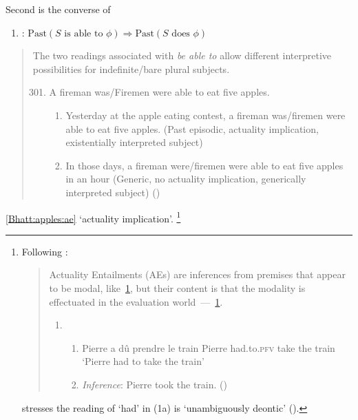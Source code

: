 \begin{note}
  Second is the converse of \BoyPS{}

  \begin{enumerate}[label=]
  \item
    \label{Boylan:Past-Success:C}
    \BoyPSC{}: \(\text{Past}(S\text{ is able to }\phi) \Rightarrow \text{Past}(S\text{ does }\phi)\)
  \end{enumerate}

  \citeauthor{Bhatt:2008aa}

  \begin{quote}
    The two readings associated with \emph{be able to} allow different interpretive possibilities for indefinite/bare plural subjects.
    \begin{enumerate}[label=(\arabic*), ref=(\arabic*)]
      \setcounter{enumi}{300}
    \item
      A fireman was/Firemen were able to eat five apples.
      \begin{enumerate}[label=\alph*., ref=(301\alph*)]
      \item
        \label{Bhatt:apples:ae}
        Yesterday at the apple eating contest, a fireman was/firemen were able to eat five apples.
        (Past episodic, actuality implication, existentially interpreted subject)
      \item
        In those days, a fireman were/firemen were able to eat five apples in an hour (Generic, no actuality implication, generically interpreted subject)%
        \mbox{}\hfill\mbox{(\citeyear[160]{Bhatt:2008aa})}
      \end{enumerate}
    \end{enumerate}
  \end{quote}
  \ref{Bhatt:apples:ae} `actuality implication'.%
  \footnote{
    Following \textcite{Alxatib:2019wf}:
\begin{quote}
      Actuality Entailments (AEs) are inferences from premises that appear to be modal, like~\ref{Alxatib:a}, but their content is that the modality is effectuated in the evaluation world~---~\ref{Alxatib:b}.
      \begin{enumerate}[label=(\arabic*)]
      \item
        \begin{enumerate}[label=\alph*., ref=(1\alph*)]
        \item
          \label{Alxatib:a}
          Pierre a dû \phantom{to.pfv} prendre le \phantom{e} train \newline
          Pierre had.to.\textsc{pfv} take \phantom{dre} the train\newline
          `Pierre had to take the train'
        \item
          \label{Alxatib:b}
          \emph{Inference}: Pierre took the train.%
          \mbox{}\hfill\mbox{(\citeyear[701]{Alxatib:2019wf})}
        \end{enumerate}
      \end{enumerate}
    \end{quote}
    \citeauthor{Alxatib:2019wf} stresses the reading of `had' in (1a) is `unambiguously deontic' (\citeyear[703]{Alxatib:2019wf}).

}
\end{note}
